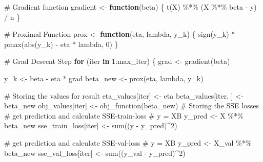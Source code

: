 \documentclass[
  letterpaper,
  DIV=11,
  numbers=noendperiod]{scrartcl}
\newenvironment{Shaded}{\begin{snugshade}}{\end{snugshade}}
\newcommand{\CommentTok}[1]{\textcolor[rgb]{0.37,0.37,0.37}{#1}}
\newcommand{\ControlFlowTok}[1]{\textcolor[rgb]{0.00,0.23,0.31}{\textbf{#1}}}
\newcommand{\DecValTok}[1]{\textcolor[rgb]{0.68,0.00,0.00}{#1}}
\newcommand{\FunctionTok}[1]{\textcolor[rgb]{0.28,0.35,0.67}{#1}}
\newcommand{\NormalTok}[1]{\textcolor[rgb]{0.00,0.23,0.31}{#1}}
\newcommand{\OtherTok}[1]{\textcolor[rgb]{0.00,0.23,0.31}{#1}}
\newcommand{\SpecialCharTok}[1]{\textcolor[rgb]{0.37,0.37,0.37}{#1}}
\begin{document}
\begin{Shaded}
\begin{Highlighting}[]
  \CommentTok{\# Gradient function}
\NormalTok{  gradient }\OtherTok{\textless{}{-}} \ControlFlowTok{function}\NormalTok{(beta) \{}
    \FunctionTok{t}\NormalTok{(X) }\SpecialCharTok{\%*\%}\NormalTok{ (X }\SpecialCharTok{\%*\%}\NormalTok{ beta }\SpecialCharTok{{-}}\NormalTok{ y) }\SpecialCharTok{/}\NormalTok{ n}
\NormalTok{  \}}
  
  \CommentTok{\# Proximal Function}
\NormalTok{  prox }\OtherTok{\textless{}{-}} \ControlFlowTok{function}\NormalTok{(eta, lambda, y\_k) \{}
    \FunctionTok{sign}\NormalTok{(y\_k) }\SpecialCharTok{*} \FunctionTok{pmax}\NormalTok{(}\FunctionTok{abs}\NormalTok{(y\_k) }\SpecialCharTok{{-}}\NormalTok{ eta }\SpecialCharTok{*}\NormalTok{ lambda, }\DecValTok{0}\NormalTok{)}
\NormalTok{  \}}
  
  \CommentTok{\# Grad Descent Step}
  \ControlFlowTok{for}\NormalTok{ (iter }\ControlFlowTok{in} \DecValTok{1}\SpecialCharTok{:}\NormalTok{max\_iter) \{}
\NormalTok{    grad }\OtherTok{\textless{}{-}} \FunctionTok{gradient}\NormalTok{(beta)}
    
\NormalTok{    y\_k }\OtherTok{\textless{}{-}}\NormalTok{ beta }\SpecialCharTok{{-}}\NormalTok{ eta }\SpecialCharTok{*}\NormalTok{ grad}
\NormalTok{    beta\_new }\OtherTok{\textless{}{-}} \FunctionTok{prox}\NormalTok{(eta, lambda, y\_k)}
    
    \CommentTok{\# Storing the values for result}
\NormalTok{    eta\_values[iter] }\OtherTok{\textless{}{-}}\NormalTok{ eta}
\NormalTok{    beta\_values[iter, ] }\OtherTok{\textless{}{-}}\NormalTok{ beta\_new}
\NormalTok{    obj\_values[iter] }\OtherTok{\textless{}{-}} \FunctionTok{obj\_function}\NormalTok{(beta\_new)}
    \CommentTok{\# Storing the SSE losses}
    \CommentTok{\# get prediction and calculate SSE{-}train{-}loss}
    \CommentTok{\# y = XB}
\NormalTok{    y\_pred }\OtherTok{\textless{}{-}}\NormalTok{ X }\SpecialCharTok{\%*\%}\NormalTok{ beta\_new}
\NormalTok{    sse\_train\_loss[iter] }\OtherTok{\textless{}{-}} \FunctionTok{sum}\NormalTok{((y }\SpecialCharTok{{-}}\NormalTok{ y\_pred)}\SpecialCharTok{\^{}}\DecValTok{2}\NormalTok{)}
    
    \CommentTok{\# get prediction and calculate SSE{-}val{-}loss}
    \CommentTok{\# y = XB}
\NormalTok{    y\_pred }\OtherTok{\textless{}{-}}\NormalTok{ X\_val }\SpecialCharTok{\%*\%}\NormalTok{ beta\_new}
\NormalTok{    sse\_val\_loss[iter] }\OtherTok{\textless{}{-}} \FunctionTok{sum}\NormalTok{((y\_val }\SpecialCharTok{{-}}\NormalTok{ y\_pred)}\SpecialCharTok{\^{}}\DecValTok{2}\NormalTok{)}
    

\end{Highlighting}
\end{Shaded}
\end{document}
